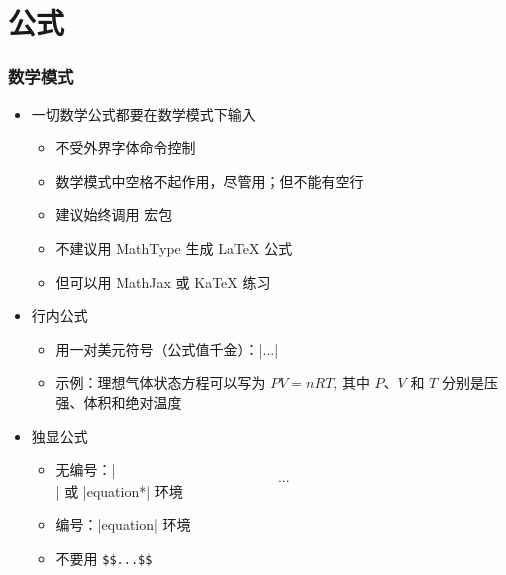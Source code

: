 \section{公式}

\begin{frame}[fragile]
\frametitle{数学模式}
\begin{itemize}
  \item 一切数学公式都要在数学模式下输入

    \begin{itemize}
      \item 不受外界字体命令控制
      \item 数学模式中空格不起作用，尽管用；但不能有空行
      \item 建议始终调用  宏包 \pause
      \item \alert{不建议用 MathType 生成 \LaTeX{} 公式}
      \item 但可以用 MathJax  或 KaTeX  练习
    \end{itemize} \pause

  \item 行内公式

    \begin{itemize}
      \item 用一对美元符号（公式值千金）：|$...$|
      \item 示例：理想气体状态方程可以写为 $PV=nRT$, 其中 $P$、$V$ 和 $T$
        分别是压强、体积和绝对温度
    \end{itemize} \pause

  \item 独显公式

    \begin{itemize}
      \item 无编号：|\[...\]| 或 |equation*| 环境
      \item 编号：|equation| 环境
      \item \alert{不要用 \texttt{\$\$...\$\$}}
    \end{itemize}
\end{itemize}
\end{frame}


